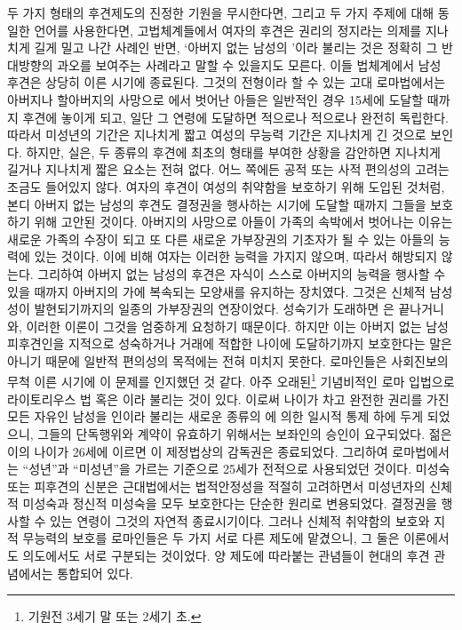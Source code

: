 두 가지 형태의 후견제도의 진정한 기원을 무시한다면,
그리고 두 가지 주제에 대해 동일한 언어를 사용한다면,
고법체계들에서
여자의 후견은
권리의 정지라는 의제를 지나치게 길게 밀고 나간 사례인 반면,
`아버지 없는 남성의 '이라 불리는 것은
정확히 그 반대방향의 과오를 보여주는 사례라고 말할 수 있을지도 모른다.
이들 법체계에서 남성 후견은 상당히 이른 시기에 종료된다.
그것의 전형이라 할 수 있는 고대 로마법에서는
아버지나 할아버지의 사망으로 에서 벗어난 아들은
일반적인 경우 15세에 도달할 때까지 후견에 놓이게 되고, 일단
그 연령에 도달하면 적으로나 적으로나 완전히 독립한다.
따라서 미성년의 기간은 지나치게 짧고
여성의 무능력 기간은 지나치게 긴 것으로 보인다.
하지만, 실은,
두 종류의 후견에 최초의 형태를 부여한 상황을 감안하면
지나치게 길거나 지나치게 짧은 요소는 전혀 없다.
어느 쪽에든 공적 또는 사적 편의성의 고려는 조금도 들어있지 않다.
여자의 후견이 여성의 취약함을 보호하기 위해 도입된 것처럼,
본디 아버지 없는 남성의 후견도
결정권을 행사하는 시기에 도달할 때까지 그들을 보호하기 위해 고안된 것이다.
아버지의 사망으로 아들이 가족의 속박에서 벗어나는 이유는
새로운 가족의 수장이 되고 또 다른 새로운 가부장권의 기초자가 될 수 있는
아들의 능력에 있는 것이다.
이에 비해 여자는 이러한 능력을 가지지 않으며, 따라서
 해방되지 않는다.
그리하여 아버지 없는 남성의 후견은
자식이 스스로 아버지의 능력을 행사할 수 있을 때까지
아버지의 가에 복속되는 모양새를 유지하는
장치였다.
그것은 신체적 남성성이 발현되기까지의 일종의 가부장권의 연장이었다.
성숙기가 도래하면 은 끝나거니와,
이러한 이론이 그것을 엄중하게 요청하기 때문이다.
하지만 이는 아버지 없는 남성 피후견인을
지적으로 성숙하거나 거래에 적합한 나이에
도달하기까지 보호한다는 말은 아니기 때문에
일반적 편의성의 목적에는 전혀 미치지 못한다.
로마인들은 사회진보의 무척 이른 시기에 이 문제를 인지했던 것 같다.
아주 오래된\footnote{기원전 3세기 말 또는 2세기 초.}
기념비적인 로마 입법으로 라이토리우스 법
혹은 이라 불리는 것이 있다.
이로써 나이가 차고 완전한 권리를 가진 모든 자유인 남성을
인이라 불리는
새로운 종류의 에 의한
일시적 통제 하에 두게 되었으니,
그들의 단독행위와 계약이 유효하기 위해서는 보좌인의 승인이 요구되었다.
젊은이의 나이가 26세에 이르면 이 제정법상의 감독권은 종료되었다.
그리하여 로마법에서는 ``성년''과 ``미성년''을 가르는 기준으로
25세가 전적으로 사용되었던 것이다.
미성숙 또는 피후견의 신분은
근대법에서는
법적안정성을 적절히 고려하면서
미성년자의 신체적 미성숙과 정신적 미성숙을 모두 보호한다는
단순한 원리로 변용되었다.
결정권을 행사할 수 있는 연령이 그것의 자연적 종료시기이다.
그러나 신체적 취약함의 보호와 지적 무능력의 보호를
로마인들은 두 가지 서로 다른 제도에 맡겼으니, 그 둘은
이론에서도 의도에서도 서로 구분되는 것이었다.
양 제도에 따라붙는 관념들이 현대의 후견 관념에서는 통합되어 있다.

